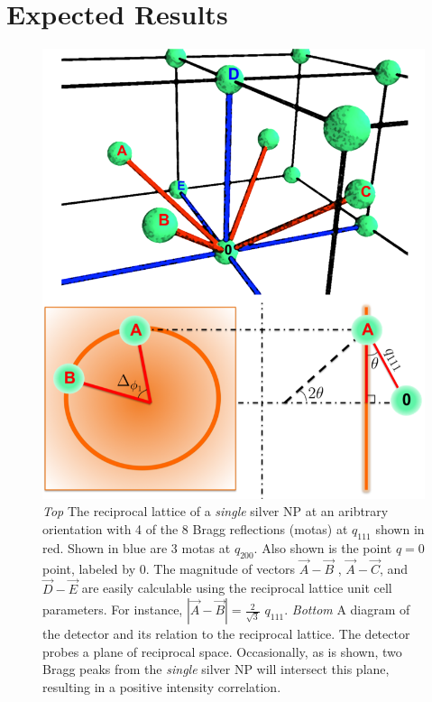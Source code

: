 \documentclass[a4paper,12pt]{article}
\begin{document}
\section*{Expected Results}

\begin{figure}
\centering
	\includegraphics[scale=0.75]{./figure_EXPECTED.png}
	\caption{ \textit{Top} The reciprocal lattice of a \emph{single} silver NP at an aribtrary orientation with 4 of the 8 Bragg reflections (motas) at $q_{111}$ shown in red. Shown in blue are 3 motas at $q_{200}$. Also shown is the point $q=0$ point, labeled by 0. The magnitude of vectors $\vec{A}-\vec{B}$ , $\vec{A}-\vec{C}$, and $\vec{D}-\vec{E}$ are easily calculable using the reciprocal lattice unit cell parameters. For instance, $\left |\vec{A} - \vec{B}\right | = \frac{2}{\sqrt{3}}\,\,q_{111}$. \textit{Bottom} A diagram of the detector and its relation to the reciprocal lattice. The detector probes a plane of reciprocal space. Occasionally, as is shown, two Bragg peaks from the \emph{single} silver NP will intersect this plane, resulting in a positive intensity correlation. }
\label{EXPECTED}
\end{figure}
\end{document}

